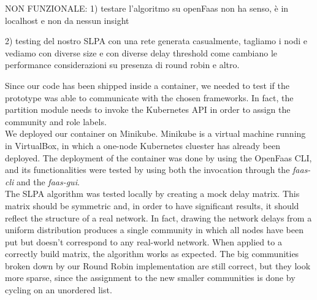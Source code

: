 NON FUNZIONALE:
1) testare l'algoritmo su openFaas non ha senso, è in localhost e non da nessun insight

2) testing del nostro SLPA con una rete generata casualmente, tagliamo i nodi e vediamo  con diverse size
    e con diverse delay threshold come cambiano le performance
    considerazioni su presenza di round robin e altro.










Since our code has been shipped inside a container, we needed to test if the prototype
was able to communicate with the chosen frameworks. In fact, the partition module  needs to invoke the Kubernetes API
in order to assign the community and role labels.\\
We deployed our container on Minikube. Minikube is a virtual machine running in VirtualBox, in which a
one-node Kubernetes cluester has already been deployed. The deployment of the container 
was done by using the OpenFaas CLI, and its functionalities were tested by using both the invocation
through the \textit{faas-cli} and the \textit{faas-gui}.\\
The SLPA algorithm was tested locally by creating a mock delay matrix. This matrix should be symmetric and, 
in order to have significant results, it should reflect the structure of a real network. In fact, drawing the network
delays from a uniform distribution produces a single community in which all nodes have been put but doesn't correspond
to any real-world network.
When applied to a correctly build matrix, the algorithm works as expected. The big communities broken down by our Round Robin 
implementation are still correct, but they look more sparse, since the assignment to the new smaller communities is done by
cycling on an unordered list.